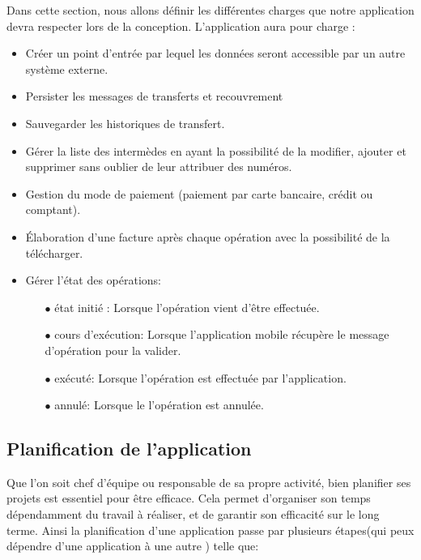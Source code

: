 	Dans cette section, nous allons définir les différentes charges que notre application devra respecter lors de la conception.
	L'application aura pour charge :
	\begin{itemize}
		\item Créer un point d'entrée par lequel les données seront accessible par un autre système externe.\\
		\item Persister les messages de transferts et recouvrement\\
		\item Sauvegarder les historiques de transfert.\\
		\item Gérer la liste des intermèdes en ayant la possibilité de la modifier, ajouter et supprimer sans oublier de leur attribuer des numéros.\\
		\item Gestion du mode de paiement (paiement par carte bancaire, crédit ou comptant).\\
		\item Élaboration d'une facture après chaque opération avec la possibilité de la télécharger.\\
		\item Gérer l'état des opérations:\\
			\begin{itemize}
				\item[$\bullet$]  état initié : Lorsque l'opération vient d'être effectuée.\\
				\item[$\bullet$] cours d'exécution: Lorsque l'application mobile récupère le message d'opération pour la valider.\\
				\item[$\bullet$] exécuté: Lorsque l'opération est effectuée par l'application.\\
				\item[$\bullet$] annulé: Lorsque le l'opération est annulée.
			\end{itemize}
	\end{itemize}

\subsection{Planification de l'application}
	Que l’on soit chef d’équipe ou responsable de sa propre activité, bien planifier ses projets est essentiel pour être efficace. Cela permet d’organiser son temps dépendamment du travail à réaliser, et de garantir son efficacité sur le long terme. Ainsi la planification d'une application passe par plusieurs étapes(qui peux dépendre d'une application à une autre ) telle que:\\
	
